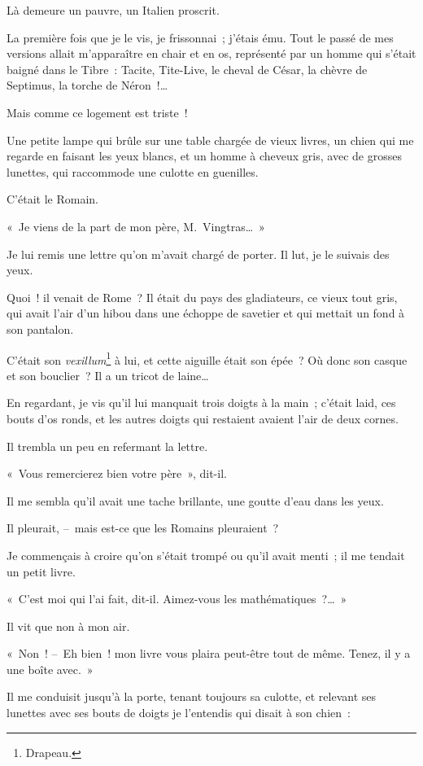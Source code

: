 \documentclass[french,twoside]{book} %
\begin{document}
Là demeure un pauvre, un Italien proscrit.\par
La première fois que je le vis, je frissonnai ; j’étais ému. Tout le passé de mes versions allait m’apparaître en chair et en os, représenté par un homme qui s’était baigné dans le Tibre : Tacite, Tite-Live, le cheval de César, la chèvre de Septimus, la torche de Néron !…\par
Mais comme ce logement est triste !\par
Une petite lampe qui brûle sur une table chargée de vieux livres, un chien qui me regarde en faisant les yeux blancs, et un homme à cheveux gris, avec de grosses lunettes, qui raccommode une culotte en guenilles.\par
C’était le Romain.\par
« Je viens de la part de mon père, M. Vingtras… »\par
Je lui remis une lettre qu’on m’avait chargé de porter. Il lut, je le suivais des yeux.\par
Quoi ! il venait de Rome ? Il était du pays des gladiateurs, ce vieux tout gris, qui avait l’air d’un hibou dans une échoppe de savetier et qui mettait un fond à son pantalon.\par
C’était son \emph{vexillum}\footnote{Drapeau.} à lui, et cette aiguille était son épée ? Où donc son casque et son bouclier ? Il a un tricot de laine…\par
En regardant, je vis qu’il lui manquait trois doigts à la main ; c’était laid, ces bouts d’os ronds, et les autres doigts qui restaient avaient l’air de deux cornes.\par
Il trembla un peu en refermant la lettre.\par
« Vous remercierez bien votre père », dit-il.\par
Il me sembla qu’il avait une tache brillante, une goutte d’eau dans les yeux.\par
Il pleurait, – mais est-ce que les Romains pleuraient ?\par
Je commençais à croire qu’on s’était trompé ou qu’il avait menti ; il me tendait un petit livre.\par
« C’est moi qui l’ai fait, dit-il. Aimez-vous les mathématiques ?… »\par
Il vit que non à mon air.\par
« Non ! – Eh bien ! mon livre vous plaira peut-être tout de même. Tenez, il y a une boîte avec. »\par
Il me conduisit jusqu’à la porte, tenant toujours sa culotte, et relevant ses lunettes avec ses bouts de doigts je l’entendis qui disait à son chien :\par
\end{document}
